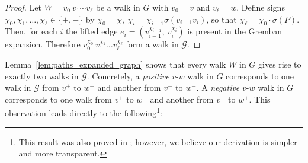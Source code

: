 \documentclass[reprint,onecolumn]{article}
\newcommand{\mc}[1]{\mathcal{#1}}
\newcommand{\1}{\mathbb{1}}
\newcommand{\0}{\mathbf{0}}
\begin{document}
\begin{proof}
Let 
\(
W  =  v_0\ v_1 \cdots v_\ell
\)
be a walk in $G$ with $v_0=v$ and $v_\ell=w$.
Define signs \(\chi_0,\chi_1,\dots,\chi_\ell\in\{+,-\}\) by 
\(
\chi_0=\chi,
\
\chi_i = \chi_{i-1} \sigma(v_{i-1}v_i)
\), so that $\chi_\ell = \chi_0 \cdot \sigma(P)$.
Then, for each \(i\) the lifted edge
\(
e_i = (v_{i-1}^{\chi_{i-1}},\ v_i^{\chi_i})
\)
is present in the Gremban expansion. Therefore $v_0^{\chi_0}\ v_1^{\chi_1}\hdots v_\ell^{\chi_\ell} $ form a walk in $\mc G$.
\end{proof}
Lemma~\ref{lem:paths_expanded_graph} shows that every walk \(W\) in \(G\) gives rise to exactly two walks in \(\mc G\). Concretely, a \textit{positive} \(v\)-\(w\) walk in \(G\) corresponds to one walk in \(\mc G\) from \(v^+\) to \(w^+\) and another from \(v^-\) to \(w^-\). A \textit{negative} \(v\)-\(w\) walk in \(G\) corresponds to one walk from \(v^+\) to \(w^-\) and another from \(v^-\) to \(w^+\). This observation leads directly to the following\footnote{This result was also proved in \cite[Theorem~3.4]{fox2017numerical}; however, we believe our derivation is simpler and more transparent.}:
\end{document}

